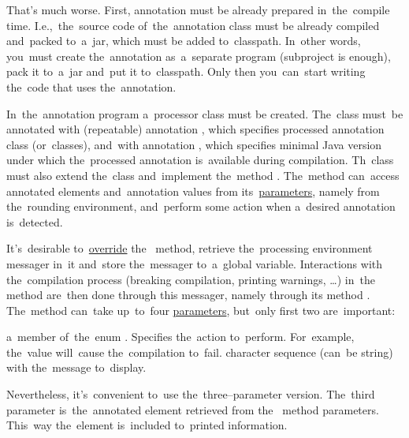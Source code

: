 
That's much worse.
First, annotation must be already prepared in~the~compile time.
I.e.,~the~source code of~the~annotation class must be already compiled and~packed to~a~jar, which must be added to~classpath.
In~other words, you~must create the~annotation as~a~separate program (subproject is enough), pack it to~a~jar and~put it to~classpath.
Only then you~can~start writing the~code that uses the~annotation.

In~the~annotation program a~processor class must be created.
The~class must~be annotated with (repeatable) annotation , which specifies processed annotation class (or~classes), and~with annotation , which specifies minimal Java version under which the~processed annotation is~available during compilation.
Th~class must also extend the~class  and~implement the~method .
The~method can~access annotated elements and~annotation values from its~\hyperref[parameterargument]{parameters}, namely from the~rounding environment, and~perform some action when a~desired annotation is~detected.

It's~desirable to~\hyperref[javaoverride]{override} the~ method, retrieve the~processing environment messager in~it and~store the~messager to~a~global variable.
Interactions with the~compilation process (breaking compilation, printing warnings, \dots) in~the~ method are~then done through this messager, namely through its method .
The~method can~take up~to~four \hyperref[parameterargument]{parameters}, but~only first two are~important:
\begin{itemize}
     a~member of~the~enum . Specifies the~action to~perform. For~example, the~value  will~cause the~compilation to~fail.
     character sequence (can~be string) with the~message to~display.
\end{itemize}
\noindent Nevertheless, it's~convenient to~use the~three--parameter version.
The~third parameter is~the~annotated element retrieved from the~ method parameters.
This~way the~element is~included to~printed information.

